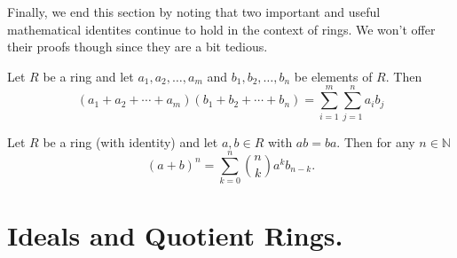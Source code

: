 \documentclass[12pt,letterpaper]{algebra_book}
\theoremstyle{definition}
\begin{document}
    Finally, we end this section by noting that two important and
    useful mathematical identites continue to hold in the context
    of rings. We won't offer their
    proofs though since they are a bit tedious. 
    
    \begin{proposition}
        Let $R$ be a ring and let $a_1, a_2, \dots, a_m$ and $b_1,
        b_2, \dots, b_n$ be elements of $R$. Then 
        \[
            (a_1 + a_2 + \cdots + a_m)(b_1 + b_2 + \cdots + b_n) 
            = \sum_{i = 1}^{m}\sum_{j = 1}^{n}a_ib_j
        \]
    \end{proposition}

    \begin{proposition}
        Let $R$ be a ring (with identity) and let $a, b \in R$
        with $ab = ba$. Then for any $n \in \mathbb{N}$ 
        \[
            (a + b)^n = \sum_{k = 0}^{n} {n\choose k} a^kb_{n-k}.
        \]
    \end{proposition}



    \newpage
    \section{Ideals and Quotient Rings.}
    
\end{document}
